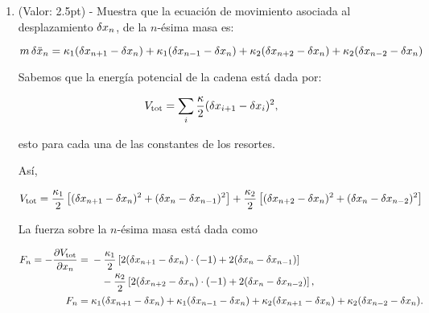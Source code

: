\documentclass[./../main.tex]{subfiles}
\begin{document}
        \begin{enumerate}
            \item (Valor: 2.5pt) - Muestra que la ecuación de movimiento asociada al desplazamiento \(\fdif{x_{n}}\), de la \(n\)-ésima masa es:
            
            \begin{equation*}
                m\fdif{\ddot{x}_{n}} = \kappa_{1}(\fdif{x_{n + 1}} - \fdif{x_{n}}) + \kappa_{1}(\fdif{x_{n - 1}} - \fdif{x_{n}}) + \kappa_{2}(\fdif{x_{n + 2}} - \fdif{x_{n}}) + \kappa_{2}(\fdif{x_{n - 2}} - \fdif{x_{n}})
            \end{equation*}

                \startsolution[print]

                Sabemos que la energía potencial de la cadena está dada por:

                \begin{equation*}
                    V_{\text{tot}} = \sum_{i}\dfrac{\kappa}{2}(\fdif{x_{i + 1}} - \fdif{x_{i}})^{2},
                \end{equation*}

                esto para cada una de las constantes de los resortes.

                Así,

                \begin{equation*}
                    V_{\text{tot}} = \dfrac{\kappa_{1}}{2}\left[(\fdif{x_{n + 1}} -\fdif{x_{n}})^{2} + (\fdif{x_{n}} - \fdif{x_{n - 1}})^{2}\right]
                    + \dfrac{\kappa_{2}}{2}\left[(\fdif{x_{n + 2}} - \fdif{x_{n}})^{2} + (\fdif{x_{n}} - \fdif{x_{n - 2}})^{2}\right]
                \end{equation*}

                \pagebreak
                La fuerza sobre la \(n\)-ésima masa está dada como

                \begin{align*}
                    F_{n} = -\pdv{V_{\text{tot}}}{x_{n}} &= 
                    \begin{multlined}[t]
                        -\dfrac{\kappa_{1}}{2}\left[2(\fdif{x_{n + 1}} - \fdif{x_{n}})\cdot (-1)
                    + 2(\fdif{x_{n}} - \fdif{x_{n - 1}})\right]\\
                    - \dfrac{\kappa_{2}}{2}\left[2(\fdif{x_{n + 2}} - \fdif{x_{n}})\cdot(-1) + 2(\fdif{x_{n}} - \fdif{x_{n - 2}})\right],
                    \end{multlined}\\
                    F_{n} &= \kappa_{1}(\fdif{x_{n + 1}} - \fdif{x_{n}}) + \kappa_{1}(\fdif{x_{n - 1}} - \fdif{x_{n}}) + \kappa_{2}(\fdif{x_{n + 1}} - \fdif{x_{n}}) + \kappa_{2}(\fdif{x_{n - 2}} - \fdif{x_{n}}).
                \end{align*}


\end{enumerate}
\end{document}
